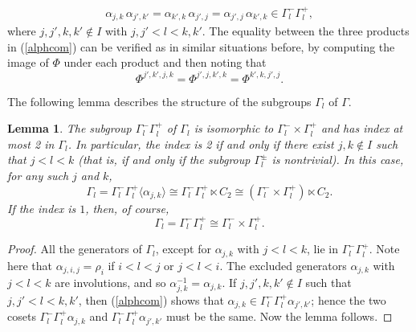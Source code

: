 \documentclass[12pt]{article}
\renewcommand{\>}{\rangle}
\newtheorem{lemma}[theorem]{Lemma}
\theoremstyle{definition}\newtheorem{definition}{Definition}[section]
\begin{document}
\begin{eqnarray}
\label{alphcom}
\alpha_{j,k}\,\alpha_{j',k'} = \alpha_{k',k}\,\alpha_{j',j}=\alpha_{j',j}\,\alpha_{k',k} \in \Gamma_l^{-}\Gamma_l^{+} ,
\end{eqnarray}
where $j,j',k,k'\notin I$ with $j,j'< l <k,k'$. The equality between the three products in (\ref{alphcom}) can be verified as in similar situations before, by computing the image of $\Phi$ under each product and then noting that 
\[ \Phi^{j',k',j,k}=\Phi^{j',j,k',k}=\Phi^{k',k,j',j}.\]
\smallskip

The following lemma describes the structure of the subgroups $\Gamma_l$ of $\Gamma$.

\begin {lemma}
\label{gasub}
The subgroup $\Gamma_l^{-} \Gamma_l^{+}$ of $\Gamma_l$ is isomorphic to $\Gamma_l^{-}\times\Gamma_l^{+}$ and has index at most 2 in $\Gamma_l$. In particular, the index is 2 if and only if there exist $j,k \notin I$ such that $j<l<k$ (that is, if and only if the subgroup $\Gamma_l^{\pm}$ is nontrivial). In this case, for any such $j$ and $k$, 
$$\Gamma_l=\Gamma_l^{-}\Gamma_l^{+}\langle \alpha_{j,k} \rangle \cong \Gamma_l^{-}\Gamma_l^{+} \ltimes C_2 
\cong (\Gamma_l^{-}\times\Gamma_l^{+})\ltimes C_2.$$
If the index is $1$, then, of course,
\[\Gamma_l=\Gamma_l^{-}\Gamma_l^{+} \cong \Gamma_l^{-}\times\Gamma_l^{+}.\]
\end{lemma}

\begin{proof}
All the generators of $\Gamma_l$, except for $\alpha_{j,k}$ with $j<l<k$, lie in $\Gamma_l^{-}\Gamma_l^{+}$. Note here that $\alpha_{j,i,j}=\rho_i$ if $i<l<j$ or $j<l<i$. The excluded generators $\alpha_{j,k}$ with $j<l<k$ are involutions, and so $\alpha_{j,k}^{-1}=\alpha_{j,k}$. If $j,j', k,k' \notin I$ such that $j,j' < l < k,k'$, then (\ref{alphcom}) shows that $\alpha_{j,k} \in \Gamma_l^{-}\Gamma_l^{+}\alpha_{j',k'}$; hence the two cosets $\Gamma_l^{-}\Gamma_l^{+}\alpha_{j,k}$ and $\Gamma_l^{-}\Gamma_l^{+}\alpha_{j',k'}$ must be the same. Now the  lemma follows.
\end{proof}
\end{document}
